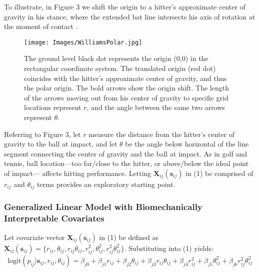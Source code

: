 \documentclass{article}
\begin{document}
To illustrate, in Figure 3 we shift the origin to a hitter's approximate center of gravity in his stance, where the extended bat line intersects his axis of rotation at the moment of contact \citep{Welch1995}. 


  \begin{figure}[H]
	\centering
	\texttt{[image: Images/WilliamsPolar.jpg]} 
	\caption{The ground level black dot represents the origin (0,0) in the rectangular coordinate system. The translated origin (red dot) coincides with the hitter's approximate center of gravity, and thus the polar origin. The bold arrows show the origin shift. The length of the arrows moving out from his center of gravity to specific grid locations represent $r$, and the angle between the same two arrows represent $\theta$.}
	\end{figure} 
Referring to Figure 3, let $r$ measure the distance from the hitter's center of gravity to the ball at impact, and let $\theta$ be the angle below horizontal of the line segment connecting the center of gravity and the ball at impact. As in golf and tennis, ball location---too far/close to the hitter, or above/below the ideal point of impact--- affects hitting performance. Letting $\pmb{X}_{ij}(\pmb{s}_{ij})$ in (1) be comprised of $r_{ij}$ and $\theta_{ij}$ terms provides an exploratory starting point.

\subsubsection{Generalized Linear Model with Biomechanically Interpretable Covariates} %

Let covariate vector $\pmb{X}_{ij}(\pmb{s}_{ij})$ in (1) be defined as $\pmb{X}_{ij}(\pmb{s}_{ij}) = \{r_{ij}, \theta_{ij}, r_{ij}\theta_{ij}, r_{ij}^{2}, \theta_{ij}^{2}, r_{ij}^{2}\theta_{ij}^{2}\}$. Substituting into (1) yields:
\begin{equation}
\text{logit}(p_{ij}|\pmb{s}_{ij}, r_{ij}, \theta_{ij}) = \beta_{j0} + \beta_{j1}r_{ij} + \beta_{j2} \theta_{ij} + \beta_{j3} r_{ij} \theta_{ij} + \beta_{j4}r_{ij}^{2} + \beta_{j5} \theta_{ij}^{2} + \beta_{j6} r_{ij}^{2} \theta_{ij}^{2}
\end{equation}
\end{document}
